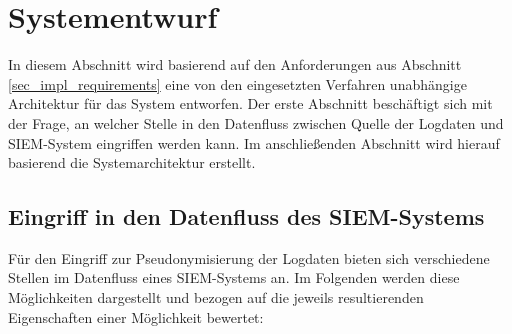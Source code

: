 \section{Systementwurf}

\label{sec_impl_architecture}

In diesem Abschnitt wird basierend auf den Anforderungen aus Abschnitt \ref{sec_impl_requirements} eine von den eingesetzten Verfahren unabhängige Architektur für das System entworfen. Der erste Abschnitt beschäftigt sich mit der Frage, an welcher Stelle in den Datenfluss zwischen Quelle der Logdaten und SIEM-System eingriffen werden kann. Im anschließenden Abschnitt wird hierauf basierend die Systemarchitektur erstellt.

\subsection{Eingriff in den Datenfluss des SIEM-Systems}

\label{sec_over_dataflow_siem}

Für den Eingriff zur Pseudonymisierung der Logdaten bieten sich verschiedene Stellen im Datenfluss eines SIEM-Systems an. Im Folgenden werden diese Möglichkeiten dargestellt und bezogen auf die jeweils resultierenden Eigenschaften einer Möglichkeit bewertet:

